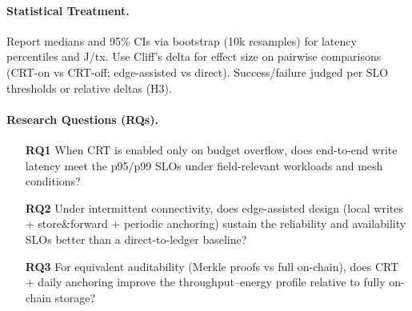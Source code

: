 \documentclass[12pt,onecolumn]{IEEEtran} %
\begin{document}
\paragraph{Statistical Treatment.}
Report medians and 95\% CIs via bootstrap (10k resamples) for latency percentiles and J/tx. Use Cliff’s delta for effect size on pairwise comparisons (CRT-on vs CRT-off; edge-assisted vs direct). Success/failure judged per SLO thresholds or relative deltas (H3).

\paragraph{Research Questions (RQs).}
\begin{enumerate}
  \item[\textbf{RQ1}] When CRT is enabled only on budget overflow, does end-to-end write latency meet the p95/p99 SLOs under field-relevant workloads and mesh conditions?
  \item[\textbf{RQ2}] Under intermittent connectivity, does edge-assisted design (local writes + store\&forward + periodic anchoring) sustain the reliability and availability SLOs better than a direct-to-ledger baseline?
  \item[\textbf{RQ3}] For equivalent auditability (Merkle proofs vs full on-chain), does CRT + daily anchoring improve the throughput--energy profile relative to fully on-chain storage?
\end{enumerate}
\end{document}
